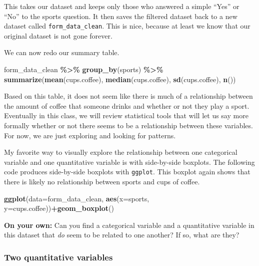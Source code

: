 \documentclass[
]{article}
\newenvironment{Shaded}{\begin{snugshade}}{\end{snugshade}}
\newcommand{\AttributeTok}[1]{\textcolor[rgb]{0.13,0.29,0.53}{#1}}
\newcommand{\FunctionTok}[1]{\textcolor[rgb]{0.13,0.29,0.53}{\textbf{#1}}}
\newcommand{\NormalTok}[1]{#1}
\newcommand{\SpecialCharTok}[1]{\textcolor[rgb]{0.81,0.36,0.00}{\textbf{#1}}}
\begin{document}
This takes our dataset and keeps only those who answered a simple
``Yes'' or ``No'' to the sports question. It then saves the filtered
dataset back to a new dataset called \texttt{form\_data\_clean}. This is
nice, because at least we know that our original dataset is not gone
forever.

We can now redo our summary table.

\begin{Shaded}
\begin{Highlighting}[]
\NormalTok{form\_data\_clean }\SpecialCharTok{\%\textgreater{}\%} \FunctionTok{group\_by}\NormalTok{(sports) }\SpecialCharTok{\%\textgreater{}\%} \FunctionTok{summarize}\NormalTok{(}\FunctionTok{mean}\NormalTok{(cups.coffee), }\FunctionTok{median}\NormalTok{(cups.coffee), }\FunctionTok{sd}\NormalTok{(cups.coffee), }\FunctionTok{n}\NormalTok{())}
\end{Highlighting}
\end{Shaded}

Based on this table, it does not seem like there is much of a
relationship between the amount of coffee that someone drinks and
whether or not they play a sport. Eventually in this class, we will
review statistical tools that will let us say more formally whether or
not there seems to be a relationship between these variables. For now,
we are just exploring and looking for patterns.

My favorite way to visually explore the relationship between one
categorical variable and one quantitative variable is with side-by-side
boxplots. The following code produces side-by-side boxplots with
\texttt{ggplot}. This boxplot again shows that there is likely no
relationship between sports and cups of coffee.

\begin{Shaded}
\begin{Highlighting}[]
\FunctionTok{ggplot}\NormalTok{(}\AttributeTok{data=}\NormalTok{form\_data\_clean, }\FunctionTok{aes}\NormalTok{(}\AttributeTok{x=}\NormalTok{sports, }\AttributeTok{y=}\NormalTok{cups.coffee))}\SpecialCharTok{+}\FunctionTok{geom\_boxplot}\NormalTok{()}
\end{Highlighting}
\end{Shaded}

\label{boxedtext}
\textbf{On your own: } Can you find a categorical variable and a
quantitative variable in this dataset that \emph{do} seem to be related
to one another? If so, what are they?

\subsubsection{Two quantitative
variables}\label{two-quantitative-variables}
\end{document}
